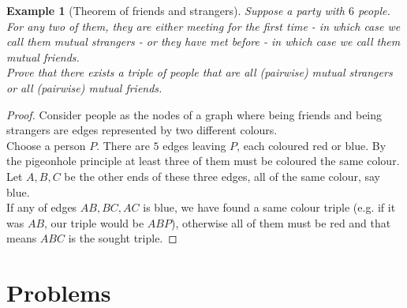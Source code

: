 \documentclass[12pt,a4paper]{article}
\newtheorem{theorem}{Example}
\begin{document}
\begin{theorem}[Theorem of friends and strangers]
Suppose a party with $6$ people. For any two of them, they are either meeting for the first time - in which case we call them mutual strangers - or they have met before - in which case we call them mutual friends.\\
Prove that there exists a triple of people that are all (pairwise) mutual strangers or all (pairwise) mutual friends.
\end{theorem}
\begin{proof}
Consider people as the nodes of a graph where being friends and being strangers are edges represented by two different colours.\\
Choose a person $P$. There are $5$ edges leaving $P$, each coloured red or blue. By the pigeonhole principle at least three of them must be coloured the same colour. Let $A,B,C$ be the other ends of these three edges, all of the same colour, say blue.\\
If any of edges $AB, BC, AC$ is blue, we have found a same colour triple (e.g. if it was $AB$, our triple would be $ABP$), otherwise all of them must be red and that means $ABC$ is the sought triple.
\end{proof}

\section{Problems}
\end{document}
